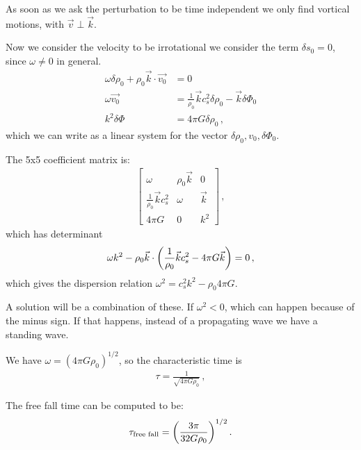 \documentclass[main.tex]{subfiles}
\begin{document}
As soon as we ask the perturbation to be time independent we only find vortical motions, with \(\vec{v} \perp \vec{k}\). 

Now we consider the velocity to be irrotational we consider the term \(\delta s_0 =0\), since \(\omega \neq 0\) in general. 
%
\begin{subequations}
\begin{align}
  \omega \delta \rho_0 + \rho_0 \vec{k} \cdot \vec{v_0} &=0  \\
  \omega \vec{v_0} &= \frac{1}{\rho_0 } \vec{k}
  c^2_s \delta \rho_0  
  - \vec{k} \delta \Phi_0 \\
  k^2 \delta \Phi &= 4 \pi G \delta \rho_0 
\,,
\end{align}
\end{subequations}
%
which we can write as a linear system for the vector \(\delta \rho_0 , v_0, \delta \Phi_0 \). 

The 5x5 coefficient matrix is:
%
\begin{subequations}
\begin{align}
  \left[\begin{array}{ccc}
  \omega  & \rho_0 \vec{k}  & 0 \\ 
  \frac{1}{\rho_0 } \vec{k} c_s^2 & \omega  & \vec{k} \\ 
  4 \pi G & 0 & k^2
  \end{array}\right]
  \,,
\end{align}
\end{subequations}
%
which has determinant 
%
\begin{align}
  \omega k^2 - \rho_0 \vec{k} \cdot \qty( \frac{1}{\rho_0 }\vec{k} c_s^2 - 4 \pi G \vec{k} ) = 0
\,,
\end{align}
%
which gives the dispersion relation \(\omega^2 = c_s^2 k^2 - \rho_0 4 \pi G \). 

A solution will be a combination of these. If \(\omega^2<0\), which can happen because of the minus sign. If that happens, instead of a propagating wave we have a standing wave. 

We have \(\omega = (4 \pi G \rho_0  )^{1/2}\), so the characteristic time is 
%
\begin{align}
  \tau = \frac{1}{\sqrt{4 \pi G \rho_0 }}
\,,
\end{align}
%


The free fall time can be computed to be: 
%
\begin{align}
  \tau _{\text{free fall}} = \qty(\frac{3 \pi }{ 32 G \rho_0 })^{1/2}
\,.
\end{align}
%
\end{document}
